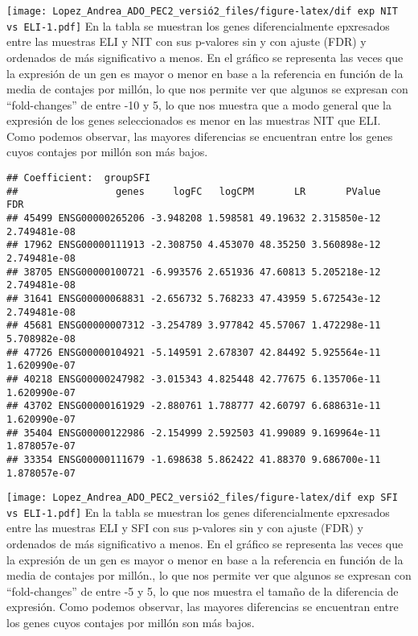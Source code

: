 \documentclass[
]{article}
\begin{document}
\texttt{[image: Lopez\_Andrea\_ADO\_PEC2\_versió2\_files/figure-latex/dif exp NIT vs ELI-1.pdf]}
En la tabla se muestran los genes diferencialmente epxresados entre las
muestras ELI y NIT con sus p-valores sin y con ajuste (FDR) y ordenados
de más significativo a menos. En el gráfico se representa las veces que
la expresión de un gen es mayor o menor en base a la referencia en
función de la media de contajes por millón, lo que nos permite ver que
algunos se expresan con ``fold-changes'' de entre -10 y 5, lo que nos
muestra que a modo general que la expresión de los genes seleccionados
es menor en las muestras NIT que ELI. Como podemos observar, las mayores
diferencias se encuentran entre los genes cuyos contajes por millón son
más bajos.

\begin{verbatim}
## Coefficient:  groupSFI 
##                 genes     logFC   logCPM       LR       PValue          FDR
## 45499 ENSG00000265206 -3.948208 1.598581 49.19632 2.315850e-12 2.749481e-08
## 17962 ENSG00000111913 -2.308750 4.453070 48.35250 3.560898e-12 2.749481e-08
## 38705 ENSG00000100721 -6.993576 2.651936 47.60813 5.205218e-12 2.749481e-08
## 31641 ENSG00000068831 -2.656732 5.768233 47.43959 5.672543e-12 2.749481e-08
## 45681 ENSG00000007312 -3.254789 3.977842 45.57067 1.472298e-11 5.708982e-08
## 47726 ENSG00000104921 -5.149591 2.678307 42.84492 5.925564e-11 1.620990e-07
## 40218 ENSG00000247982 -3.015343 4.825448 42.77675 6.135706e-11 1.620990e-07
## 43702 ENSG00000161929 -2.880761 1.788777 42.60797 6.688631e-11 1.620990e-07
## 35404 ENSG00000122986 -2.154999 2.592503 41.99089 9.169964e-11 1.878057e-07
## 33354 ENSG00000111679 -1.698638 5.862422 41.88370 9.686700e-11 1.878057e-07
\end{verbatim}

\texttt{[image: Lopez\_Andrea\_ADO\_PEC2\_versió2\_files/figure-latex/dif exp SFI vs ELI-1.pdf]}
En la tabla se muestran los genes diferencialmente epxresados entre las
muestras ELI y SFI con sus p-valores sin y con ajuste (FDR) y ordenados
de más significativo a menos. En el gráfico se representa las veces que
la expresión de un gen es mayor o menor en base a la referencia en
función de la media de contajes por millón., lo que nos permite ver que
algunos se expresan con ``fold-changes'' de entre -5 y 5, lo que nos
muestra el tamaño de la diferencia de expresión. Como podemos observar,
las mayores diferencias se encuentran entre los genes cuyos contajes por
millón son más bajos.
\end{document}
